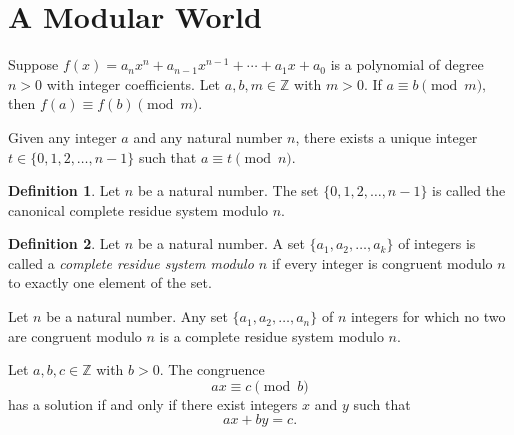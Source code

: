 \documentclass{article}
\theoremstyle{definition}
\newtheorem*{definition*}{Definition}
\newenvironment{manualtheorem}[1]{%
  \renewcommand{\thetheorem}{#1}%
  \theorem%
}{%
  \endtheorem%
}
\begin{document}
\section{A Modular World}

\begin{manualtheorem}{3.8}
	Suppose \(f(x) = a_n x^n + a_{n-1} x^{n-1} + \cdots + a_1 x + a_0\)
	is a polynomial of degree $n > 0$ with integer coefficients.
	Let $a, b, m \in \mathbb{Z}$ with $m > 0$.
	If \(a \equiv b \pmod{m},\)
	then \(f(a) \equiv f(b) \pmod{m}.\)
\end{manualtheorem}

\begin{manualtheorem}{3.14}
	Given any integer $a$ and any natural number $n$, there exists a unique integer \\ $t
		\in \{0,1,2,\ldots,n-1\}$ such that $a \equiv t \pmod{n}$.
\end{manualtheorem}

\begin{definition*}
	Let $n$ be a natural number. The set $\{0,1,2,\ldots,n-1\}$ is
	called the canonical complete residue system modulo $n$.
\end{definition*}

\begin{definition*}
Let $n$ be a natural number. A set $\{a_{1}, a_{2}, \ldots, a_{k}\}$ of integers is called a 
\emph{complete residue system modulo $n$} if every integer is congruent modulo $n$ to exactly
one element of the set.
\end{definition*}


\begin{manualtheorem}{3.17}
	Let $n$ be a natural number. Any set $\{a_1, a_2, \ldots, a_n\}$ of $n$ integers
	for which no two are congruent modulo $n$ is a complete residue system modulo $n$.
\end{manualtheorem}

\begin{manualtheorem}{3.19}
	Let $a, b, c \in \mathbb{Z}$ with $b > 0$. The congruence
	\[
		ax \equiv c \pmod{b}
	\]
	has a solution if and only if there exist integers $x$ and $y$ such that
	\[
		ax + by = c.
	\]
\end{manualtheorem}
\end{document}
